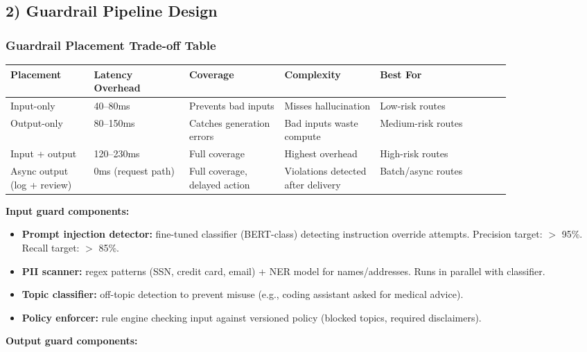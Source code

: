 \subsection*{2) Guardrail Pipeline Design}

\subsubsection*{Guardrail Placement Trade-off Table}

\small
\begin{tabular}{|p{0.14\linewidth}|p{0.16\linewidth}|p{0.16\linewidth}|p{0.16\linewidth}|p{0.22\linewidth}|}
\hline
\textbf{Placement} & \textbf{Latency Overhead} & \textbf{Coverage} & \textbf{Complexity} & \textbf{Best For} \\
\hline
Input-only & 40--80ms & Prevents bad inputs & Misses hallucination & Low-risk routes \\
\hline
Output-only & 80--150ms & Catches generation errors & Bad inputs waste compute & Medium-risk routes \\
\hline
Input + output & 120--230ms & Full coverage & Highest overhead & High-risk routes \\
\hline
Async output (log + review) & 0ms (request path) & Full coverage, delayed action & Violations detected after delivery & Batch/async routes \\
\hline
\end{tabular}
\normalsize

\textbf{Input guard components:}

\begin{itemize}
  \item \textbf{Prompt injection detector:} fine-tuned classifier (BERT-class) detecting instruction override attempts. Precision target: $>$ 95\%. Recall target: $>$ 85\%.
  \item \textbf{PII scanner:} regex patterns (SSN, credit card, email) + NER model for names/addresses. Runs in parallel with classifier.
  \item \textbf{Topic classifier:} off-topic detection to prevent misuse (e.g., coding assistant asked for medical advice).
  \item \textbf{Policy enforcer:} rule engine checking input against versioned policy (blocked topics, required disclaimers).
\end{itemize}

\textbf{Output guard components:}

